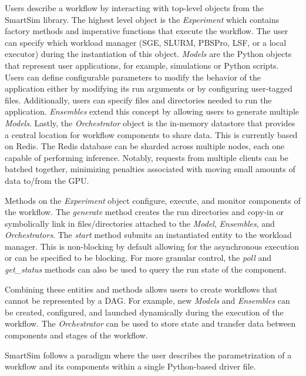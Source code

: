 \documentclass[utf8]{FrontiersinVancouver} %
\begin{document}
Users describe a workflow by interacting with top-level objects from the
SmartSim library. The highest level object is the {\em Experiment} which contains factory methods and imperative functions that execute the workflow. The user can
specify which workload manager (SGE, SLURM, PBSPro, LSF, or a local executor) during the instantiation of this object. {\em Models} are the Python objects that represent user applications, for example, simulations or Python scripts. Users can define configurable parameters to modify the behavior of the application either by modifying its run arguments or by configuring user-tagged files. Additionally, users can specify files and directories needed to run the application. {\em Ensembles} extend this concept by allowing users to generate multiple {\em Models}. Lastly, the {\em Orchestrator} object is the in-memory datastore that provides a central location for workflow components to share data. This is currently based on Redis. The Redis database can be sharded across multiple nodes, each one capable of performing inference. Notably, requests from multiple clients can be batched together, minimizing penalties associated with
moving small amounts of data to/from the GPU.

Methods on the {\em Experiment} object configure, execute, and monitor components of the workflow. The {\em generate} method creates the run directories and copy-in or symbolically link in files/directories attached to the {\em Model},  {\em Ensembles}, and {\em Orchestrators}. The {\em start} method submits an instantiated entity to the workload manager. This is non-blocking by default allowing for the asynchronous execution or can be specified to be blocking. For more granular control, the {\em poll} and {\em get\_status} methods can also be used to query the run state of the component.

Combining these entities and methods allows users to create workflows that cannot be represented by a DAG. For example, new {\em Models} and {\em Ensembles} can be created, configured, and launched dynamically during the execution of the workflow. The {\em Orchestrator} can be used to store state and transfer data between components and stages of the workflow.

SmartSim follows a paradigm where the user describes the parametrization of a workflow and its components within a single Python-based driver file.
\end{document}
